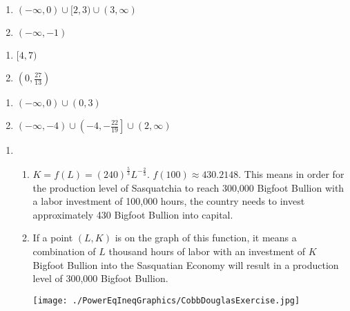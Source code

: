 \documentclass{ximera}
\begin{document}
\begin{multicols}{2}
\begin{enumerate}
\setcounter{enumi}{\value{HW}}

\item $(-\infty, 0) \cup [2,3) \cup (3, \infty)$
\item $(-\infty, -1)$  


\setcounter{HW}{\value{enumi}}
\end{enumerate}
\end{multicols}

\begin{multicols}{2}
\begin{enumerate}
\setcounter{enumi}{\value{HW}}

\item $[4,7)$  
\item $\left(0, \frac{27}{13} \right)$

\setcounter{HW}{\value{enumi}}
\end{enumerate}
\end{multicols}

\begin{multicols}{2}
\begin{enumerate}
\setcounter{enumi}{\value{HW}}
\item $(-\infty, 0) \cup (0,3)$   \vphantom{$(-\infty, -4) \cup \left(-4, -\frac{22}{19}\right] \cup (2, \infty)$}
\item $(-\infty, -4) \cup \left(-4, -\frac{22}{19}\right] \cup (2, \infty)$

\setcounter{HW}{\value{enumi}}
\end{enumerate}
\end{multicols}

\begin{enumerate}
\setcounter{enumi}{\value{HW}}
\item \begin{enumerate}

\item $K=f(L) = (240)^{ \frac{5}{3}} L^{- \frac{2}{3}}$.  $f(100)  \approx 430.2148$.  This means in order for the production level of Sasquatchia to reach 300,000 Bigfoot Bullion with a labor investment of 100,000 hours, the country needs to invest approximately 430 Bigfoot Bullion into capital.


\item If a point $(L,K)$ is on the graph of this function, it means a combination of $L$ thousand hours of labor with an investment of $K$ Bigfoot Bullion into the Sasquatian Economy will result in a production level of 300,000 Bigfoot Bullion.

\centerline{\texttt{[image: ./PowerEqIneqGraphics/CobbDouglasExercise.jpg]}}



\end{enumerate}

\end{enumerate}
\end{document}

